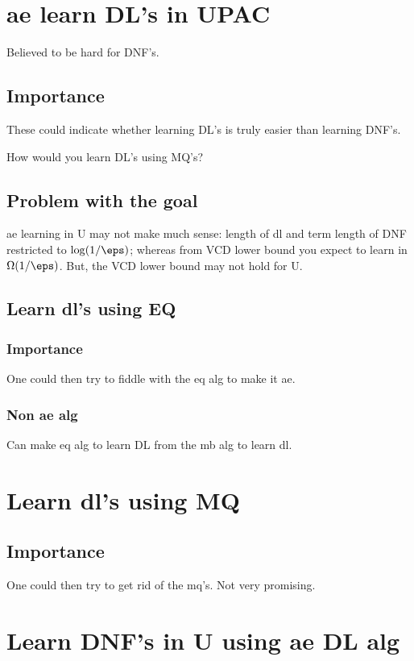 \documentclass[10pt]{amsart}
\begin{document}
\section{ae learn DL's in UPAC}
Believed to be hard for DNF's.

\subsection{Importance}
These could indicate whether learning DL's is truly easier than learning DNF's.

How would you learn DL's using MQ's?

\subsection{Problem with the goal}
ae learning in U may not make much sense: length of dl and term length of DNF restricted to $\log (1/\eps)$; whereas from VCD lower bound you expect to learn in $\Omega(1/\eps)$. But, the VCD lower bound may not hold for U.

\subsection{Learn dl's using EQ}

\subsubsection{Importance}
One could then try to fiddle with the eq alg to make it ae.

\subsubsection{Non ae alg}
Can make eq alg to learn DL from the mb alg to learn dl.

\section{Learn dl's using MQ}

\subsection{Importance}
One could then try to get rid of the mq's. Not very promising.

\section{Learn DNF's in U using ae DL alg}
\end{document}
